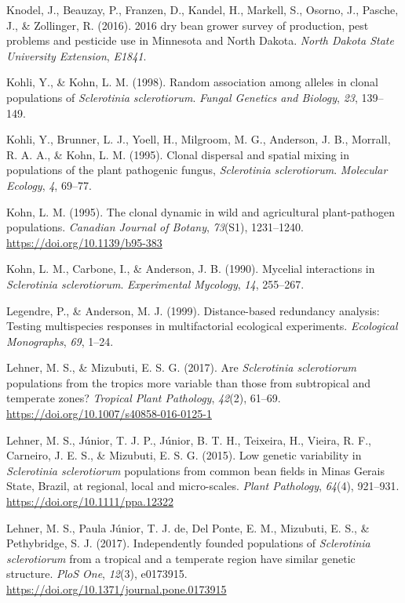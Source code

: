 \documentclass[fleqn,10pt,lineno]{wlpeerj} %
\theoremstyle{definition}
\theoremstyle{definition}
\theoremstyle{definition}
\theoremstyle{remark}
\begin{document}
\hypertarget{ref-knodel2016dry}{}
Knodel, J., Beauzay, P., Franzen, D., Kandel, H., Markell, S., Osorno,
J., Pasche, J., \& Zollinger, R. (2016). 2016 dry bean grower survey of
production, pest problems and pesticide use in Minnesota and North
Dakota. \emph{North Dakota State University Extension}, \emph{E1841}.

\hypertarget{ref-kohli1998random}{}
Kohli, Y., \& Kohn, L. M. (1998). Random association among alleles in
clonal populations of \emph{Sclerotinia sclerotiorum}. \emph{Fungal
Genetics and Biology}, \emph{23}, 139--149.

\hypertarget{ref-kohli1995clonal}{}
Kohli, Y., Brunner, L. J., Yoell, H., Milgroom, M. G., Anderson, J. B.,
Morrall, R. A. A., \& Kohn, L. M. (1995). Clonal dispersal and spatial
mixing in populations of the plant pathogenic fungus, \emph{Sclerotinia
sclerotiorum}. \emph{Molecular Ecology}, \emph{4}, 69--77.

\hypertarget{ref-kohn1995clonal}{}
Kohn, L. M. (1995). The clonal dynamic in wild and agricultural
plant-pathogen populations. \emph{Canadian Journal of Botany},
\emph{73}(S1), 1231--1240. \url{https://doi.org/10.1139/b95-383}

\hypertarget{ref-kohn1990mycelial}{}
Kohn, L. M., Carbone, I., \& Anderson, J. B. (1990). Mycelial
interactions in \emph{Sclerotinia sclerotiorum}. \emph{Experimental
Mycology}, \emph{14}, 255--267.

\hypertarget{ref-legendre1999distance}{}
Legendre, P., \& Anderson, M. J. (1999). Distance-based redundancy
analysis: Testing multispecies responses in multifactorial ecological
experiments. \emph{Ecological Monographs}, \emph{69}, 1--24.

\hypertarget{ref-lehner2017sclerotinia}{}
Lehner, M. S., \& Mizubuti, E. S. G. (2017). Are \emph{Sclerotinia
sclerotiorum} populations from the tropics more variable than those from
subtropical and temperate zones? \emph{Tropical Plant Pathology},
\emph{42}(2), 61--69. \url{https://doi.org/10.1007/s40858-016-0125-1}

\hypertarget{ref-lehner2015genetic}{}
Lehner, M. S., Júnior, T. J. P., Júnior, B. T. H., Teixeira, H., Vieira,
R. F., Carneiro, J. E. S., \& Mizubuti, E. S. G. (2015). Low genetic
variability in \emph{Sclerotinia sclerotiorum} populations from common
bean fields in Minas Gerais State, Brazil, at regional, local and
micro-scales. \emph{Plant Pathology}, \emph{64}(4), 921--931.
\url{https://doi.org/10.1111/ppa.12322}

\hypertarget{ref-lehner2017independently}{}
Lehner, M. S., Paula Júnior, T. J. de, Del Ponte, E. M., Mizubuti, E.
S., \& Pethybridge, S. J. (2017). Independently founded populations of
\emph{Sclerotinia sclerotiorum} from a tropical and a temperate region
have similar genetic structure. \emph{PloS One}, \emph{12}(3), e0173915.
\url{https://doi.org/10.1371/journal.pone.0173915}
\end{document}
